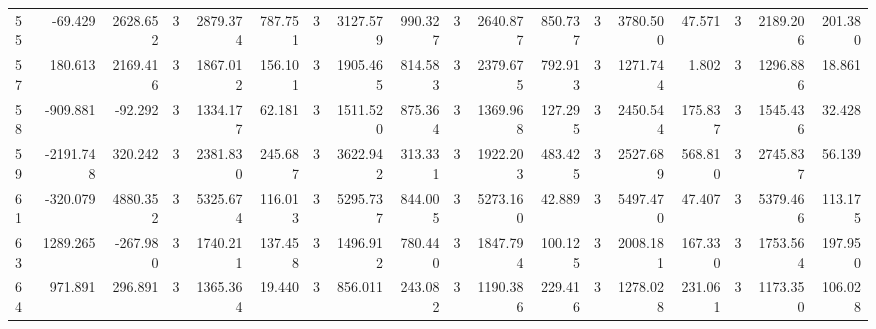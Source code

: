 \begin{table}[ht]
\begin{tabular}{lrrrrrrrrrrrrrrrrr}
55 & -69.429 & 2628.652 & 3 & 2879.374 & 787.751 & 3 & 3127.579 & 990.327 & 3 & 2640.877 & 850.737 & 3 & 3780.500 & 47.571 & 3 & 2189.206 & 201.380 \\
57 & 180.613 & 2169.416 & 3 & 1867.012 & 156.101 & 3 & 1905.465 & 814.583 & 3 & 2379.675 & 792.913 & 3 & 1271.744 & 1.802 & 3 & 1296.886 & 18.861 \\
58 & -909.881 & -92.292 & 3 & 1334.177 & 62.181 & 3 & 1511.520 & 875.364 & 3 & 1369.968 & 127.295 & 3 & 2450.544 & 175.837 & 3 & 1545.436 & 32.428 \\
59 & -2191.748 & 320.242 & 3 & 2381.830 & 245.687 & 3 & 3622.942 & 313.331 & 3 & 1922.203 & 483.425 & 3 & 2527.689 & 568.810 & 3 & 2745.837 & 56.139 \\
61 & -320.079 & 4880.352 & 3 & 5325.674 & 116.013 & 3 & 5295.737 & 844.005 & 3 & 5273.160 & 42.889 & 3 & 5497.470 & 47.407 & 3 & 5379.466 & 113.175 \\
63 & 1289.265 & -267.980 & 3 & 1740.211 & 137.458 & 3 & 1496.912 & 780.440 & 3 & 1847.794 & 100.125 & 3 & 2008.181 & 167.330 & 3 & 1753.564 & 197.950 \\
64 & 971.891 & 296.891 & 3 & 1365.364 & 19.440 & 3 & 856.011 & 243.082 & 3 & 1190.386 & 229.416 & 3 & 1278.028 & 231.061 & 3 & 1173.350 & 106.028 \\
\hline
\end{tabular}
\end{table}
